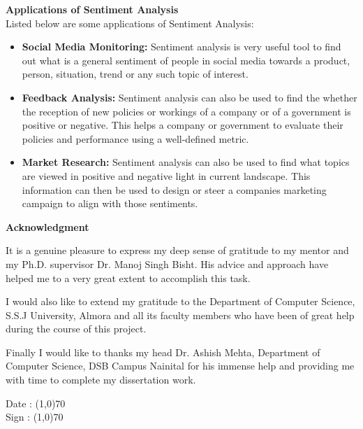 \documentclass[a4paper, 12pt]{article}
\begin{document}
\begin{sloppypar}
\large \textbf{Applications of Sentiment Analysis} \\[0.5ex]
\normalsize
Listed below are some applications of Sentiment Analysis:
\begin{itemize}
\item{
\textbf{Social Media Monitoring: } Sentiment analysis is very useful tool to find out what is a general sentiment of people in social media towards a product, person, situation, trend or any such topic of interest.}
\item{
\textbf{Feedback Analysis: } Sentiment analysis can also be used to find the whether the  reception of new policies or workings of a company or of a government is positive or negative. This helps a company or government to evaluate their policies and performance using a well-defined metric.}
\item{
\textbf{Market Research: } Sentiment analysis can also be used to find what topics are viewed in positive and negative light in current landscape. This information can then be used to design or steer a companies marketing campaign to align with those sentiments.}
\end{itemize}
\clearpage
\printbibliography
\clearpage
\begin{center}
\textbf{Acknowledgment}
\end{center}
It is a genuine pleasure to express my deep sense of gratitude to my mentor and my Ph.D. supervisor Dr. Manoj Singh Bisht. His advice and approach have helped me to a very great extent to accomplish this task. 

I would also like to extend my gratitude to the Department of Computer Science, S.S.J University, Almora and all its faculty members who have been of great help during the course of this project.

Finally I would like to thanks my head Dr. Ashish Mehta, Department of Computer Science, DSB Campus Nainital for his immense help and providing me with time to complete my dissertation work.

\begin{flushright}
Date : \line(1,0){70} \\ [1ex]
Sign : \line(1,0){70}
\end{flushright}
\thispagestyle{empty}
\end{sloppypar}
\end{document}
